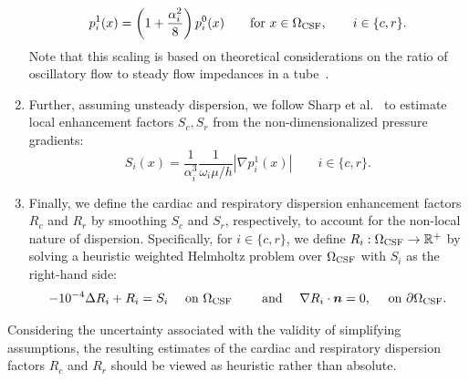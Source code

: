 \begin{enumerate}[label=\roman*)]
\begin{equation}
    p^1_i(x) = \left ( 1 + \frac{\alpha_i^2}{8} \right ) p_i^0(x)
    \qquad \text{for } x \in \Omega_{\rm CSF}, \qquad i \in \{c, r\}.
  \end{equation}
  Note that this scaling is based on theoretical considerations on the
  ratio of oscillatory flow to steady flow impedances in a
  tube~\cite[Chap.~4.3.]{van1998cardiovascular}.
\item
  Further, assuming unsteady dispersion, we follow Sharp et
  al.~\cite{keith2019dispersion} to estimate local enhancement factors
  $S_c, S_r$ from the non-dimensionalized pressure gradients:
  \begin{equation}
    S_i(x) = \frac{1}{\alpha_i^3} \frac{1}{\omega_i \mu/h} | \nabla p_i^1(x) |
    \qquad i \in \{c, r\}.
  \end{equation}
\item
  Finally, we define the cardiac and respiratory dispersion
  enhancement factors $R_c$ and $R_r$ by smoothing $S_c$ and $S_r$,
  respectively, to account for the non-local nature of
  dispersion. Specifically, for $i \in \{c, r\}$, we define $R_i :
  \Omega_{\rm CSF} \rightarrow \mathbb{R}^{+}$ by solving a heuristic weighted
  Helmholtz problem over $\Omega_{\rm CSF}$ with $S_i$ as the
  right-hand side:
  \begin{equation}
    - 10^{-4} \Delta R_i + R_i
    = S_i \quad \text{ on } \Omega_{\rm CSF}
    \qquad \text{ and } \quad
    \nabla R_i \cdot \bm n = 0, \quad \text{ on } \partial \Omega_{\rm CSF} .
\end{equation}
\end{enumerate}
Considering the uncertainty associated with the validity of
simplifying assumptions, the resulting estimates of the cardiac and
respiratory dispersion factors $R_c$ and $R_r$ 
should be viewed as heuristic rather than absolute.



